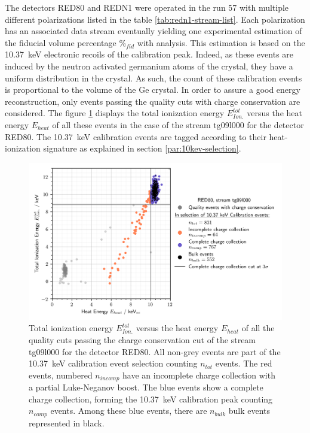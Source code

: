 The detectors RED80 and REDN1 were operated in the run 57 with multiple different polarizations listed in the table \ref{tab:redn1-stream-list}. Each polarization has an associated data stream eventually yielding one experimental estimation of the fiducial volume percentage $\%_{fid}$ with analysis. 
This estimation is based on the \SI{10.37}{\kilo\eV} electronic recoils of the calibration peak. Indeed, as these events are induced by the neutron activated germanium atoms of the crystal, they have a uniform distribution in the crystal. As such, the count of these calibration events is proportional to the volume of the Ge crystal. 
In order to assure a good energy reconstruction, only events passing the quality cuts with charge conservation are considered. The figure \ref{fig:fiducial-count} displays the total ionization energy $E_{Ion.}^{tot}$ versus the heat energy $E_{heat}$ of all these events in the case of the stream tg09l000 for the detector RED80. The \SI{10.37}{\kilo\eV} calibration events are tagged according to their heat-ionization signature as explained in section \ref{par:10kev-selection}.

\begin{figure}
\centering
\includegraphics[scale=1]{Figures/ElectrodesExperimental/fiducial_counts.png}
\caption{Total ionization energy $E_{Ion.}^{tot}$ versus the heat energy $E_{heat}$ of all the quality cuts passing the charge conservation cut of the stream tg09l000 for the detector RED80. All non-grey events are part of the \SI{10.37}{\kilo\eV} calibration event selection counting $n_{tot}$ events. The red events, numbered $n_{incomp}$ have an incomplete charge collection with a partial Luke-Neganov boost. The blue events show a complete charge collection, forming the \SI{10.37}{\kilo\eV} calibration peak counting $n_{comp}$ events. Among these blue events, there are $n_{bulk}$ bulk events represented in black.}
\label{fig:fiducial-count}
\end{figure}

